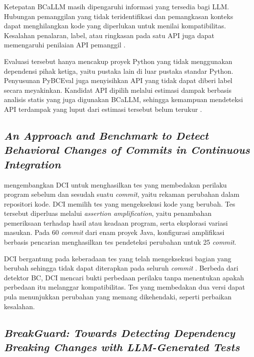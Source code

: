 Ketepatan BCaLLM masih dipengaruhi informasi yang tersedia bagi LLM\@. Hubungan pemanggilan yang tidak teridentifikasi dan pemangkasan konteks dapat menghilangkan kode yang diperlukan untuk menilai kompatibilitas. Kesalahan penalaran, label, atau ringkasan pada satu API juga dapat memengaruhi penilaian API pemanggil \parencite[Bagian~6.4]{Cheng2026BCaLLM}.

Evaluasi tersebut hanya mencakup proyek Python yang tidak menggunakan dependensi pihak ketiga, yaitu pustaka lain di luar pustaka standar Python. Penyusunan PyBCEval juga menyisihkan API yang tidak dapat diberi label secara meyakinkan. Kandidat API dipilih melalui estimasi dampak berbasis analisis statis yang juga digunakan BCaLLM, sehingga kemampuan mendeteksi API terdampak yang luput dari estimasi tersebut belum terukur \parencite[Bagian~5 dan~6.7]{Cheng2026BCaLLM}.

\subsection{\textit{An Approach and Benchmark to Detect Behavioral Changes of Commits in Continuous Integration}}
\label{subsec:dci}

\textcite{Danglot2020DCI} mengembangkan DCI untuk menghasilkan tes yang membedakan perilaku program sebelum dan sesudah suatu \textit{commit}, yaitu rekaman perubahan dalam repositori kode. DCI memilih tes yang mengeksekusi kode yang berubah. Tes tersebut diperluas melalui \textit{assertion amplification}, yaitu penambahan pemeriksaan terhadap hasil atau keadaan program, serta eksplorasi variasi masukan. Pada 60 \textit{commit} dari enam proyek Java, konfigurasi amplifikasi berbasis pencarian menghasilkan tes pendeteksi perubahan untuk 25 \textit{commit}.

DCI bergantung pada keberadaan tes yang telah mengeksekusi bagian yang berubah sehingga tidak dapat diterapkan pada seluruh \textit{commit} \parencite{Danglot2020DCI}. Berbeda dari detektor BC, DCI mencari bukti perbedaan perilaku tanpa menentukan apakah perbedaan itu melanggar kompatibilitas. Tes yang membedakan dua versi dapat pula menunjukkan perubahan yang memang dikehendaki, seperti perbaikan kesalahan.

\subsection{\textit{BreakGuard: Towards Detecting Dependency Breaking Changes with LLM-Generated Tests}}
\label{subsec:breakguard}


